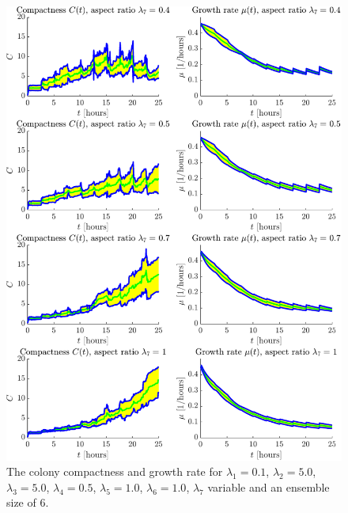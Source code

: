 \begin{figure}[!htb]
    \centering
    \includegraphics[width= \textwidth]{
        chapter3/figures/Comp_all_ar_EnsembleSize_6o0_L1_0o10_L2_5o00_L3_5o00_L4_0o50_L5_1o00_L6_1o00_L7_0o40.pdf}
    \caption{The colony compactness and growth rate for 
             $\lambda_1 = 0.1$,  
             $\lambda_2 = 5.0$, 
             $\lambda_3 = 5.0$, 
             $\lambda_4 = 0.5$, 
             $\lambda_5 = 1.0$, 
             $\lambda_6 = 1.0$, 
             $\lambda_7$ variable and an ensemble size of $6$.}
    \label{fig: sdsd}
\end{figure}


